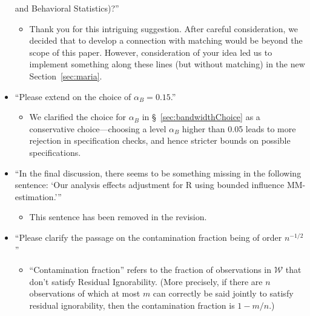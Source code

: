 \documentclass[12pt]{article}
\begin{document}
\begin{itemize}
  and Behavioral Statistics)?''
 \begin{itemize}
   \item Thank you for this intriguing suggestion. After careful
     consideration, we decided that to develop a connection with
     matching would be beyond the scope of this paper.  However,
     consideration of your idea led us to implement
     something along these lines (but without matching) in the new 
     Section~\ref{sec:maria}.
  \end{itemize}
\item ``Please extend on the choice of $\alpha_B=0.15$.''
\begin{itemize}
 \item We clarified the choice for $\alpha_B$ in
   \S~\ref{sec:bandwidthChoice} as a
   conservative choice---choosing a level $\alpha_B$ higher than 0.05
   leads to more rejection in specification checks, and hence stricter
   bounds on possible specifications.
\end{itemize}
\item ``In the final discussion, there seems to be something missing in
  the following sentence: `Our analysis effects adjustment for R using
  bounded influence MM- estimation.'''
\begin{itemize}
\item This sentence has been removed in the revision.
\end{itemize}
\item ``Please clarify the passage on the contamination fraction being of
order $n^{-1/2}$''
\begin{itemize}
 \item ``Contamination fraction'' 
   refers to the fraction of
   observations in $\mathcal{W}$ that don't satisfy Residual
   Ignorability.   (More precisely, if  there are $n$ observations of
   which at most $m$ can correctly be said jointly to satisfy residual
   ignorability, then the contamination fraction is $1-m/n$.)  


\end{itemize}
\end{itemize}
\end{document}
